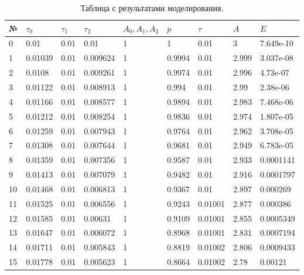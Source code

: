 \begin{table}[h!]
	\caption{Таблица с результатами моделирования.}
	\begin{tabular}{|l|l|l|l|l|l|l|l|l|}
		\hline
		№  & $\tau_0$ & $\tau_1$ & $\tau_2$ & $A_0, A_1, A_2$ & $p$    & $\tau$  & $A$   & $E$       \\ \hline
		0  & 0.01     & 0.01     & 0.01     & 1               & 1      & 0.01    & 3     & 7.649e-10 \\ \hline
		1  & 0.01039  & 0.01     & 0.009624 & 1               & 0.9994 & 0.01    & 2.999 & 3.037e-08 \\ \hline
		2  & 0.0108   & 0.01     & 0.009261 & 1               & 0.9974 & 0.01    & 2.996 & 4.73e-07  \\ \hline
		3  & 0.01122  & 0.01     & 0.008913 & 1               & 0.994  & 0.01    & 2.99  & 2.38e-06  \\ \hline
		4  & 0.01166  & 0.01     & 0.008577 & 1               & 0.9894 & 0.01    & 2.983 & 7.468e-06 \\ \hline
		5  & 0.01212  & 0.01     & 0.008254 & 1               & 0.9836 & 0.01    & 2.974 & 1.807e-05 \\ \hline
		6  & 0.01259  & 0.01     & 0.007943 & 1               & 0.9764 & 0.01    & 2.962 & 3.708e-05 \\ \hline
		7  & 0.01308  & 0.01     & 0.007644 & 1               & 0.9681 & 0.01    & 2.949 & 6.783e-05 \\ \hline
		8  & 0.01359  & 0.01     & 0.007356 & 1               & 0.9587 & 0.01    & 2.933 & 0.0001141 \\ \hline
		9  & 0.01413  & 0.01     & 0.007079 & 1               & 0.9482 & 0.01    & 2.916 & 0.0001797 \\ \hline
		10 & 0.01468  & 0.01     & 0.006813 & 1               & 0.9367 & 0.01    & 2.897 & 0.000269  \\ \hline
		11 & 0.01525  & 0.01     & 0.006556 & 1               & 0.9243 & 0.01001 & 2.877 & 0.000386  \\ \hline
		12 & 0.01585  & 0.01     & 0.00631  & 1               & 0.9109 & 0.01001 & 2.855 & 0.0005349 \\ \hline
		13 & 0.01647  & 0.01     & 0.006072 & 1               & 0.8968 & 0.01001 & 2.831 & 0.0007194 \\ \hline
		14 & 0.01711  & 0.01     & 0.005843 & 1               & 0.8819 & 0.01002 & 2.806 & 0.0009433 \\ \hline
		15 & 0.01778  & 0.01     & 0.005623 & 1               & 0.8664 & 0.01002 & 2.78  & 0.00121   \\ \hline

\end{tabular}
\end{table}
